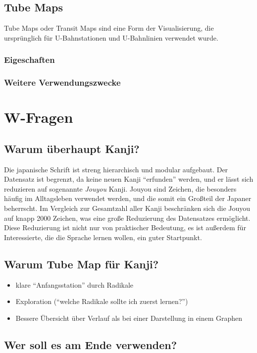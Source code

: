 \documentclass[color,german]{tudbook}
\begin{document}
\section{Tube Maps}
Tube Maps oder Transit Maps sind eine Form der Visualisierung, die ursprünglich für U-Bahnstationen und U-Bahnlinien verwendet wurde. 
\subsection{Eigeschaften}
\subsection{Weitere Verwendungszwecke}

\chapter{W-Fragen}
\section{Warum überhaupt Kanji?}
Die japanische Schrift ist streng hierarchisch und modular aufgebaut. Der Datensatz ist begrenzt, da keine neuen Kanji "`erfunden"' werden, und er lässt sich reduzieren auf sogenannte \emph{Jouyou} Kanji. Jouyou sind Zeichen, die besonders häufig im Alltagsleben verwendet werden, und die somit ein Großteil der Japaner beherrscht. Im Vergleich zur Gesamtzahl aller Kanji beschränken sich die Jouyou auf knapp 2000 Zeichen, was eine große Reduzierung des Datensatzes ermöglicht.
Diese Reduzierung ist nicht nur von praktischer Bedeutung, es ist außerdem für Interessierte, die die Sprache lernen wollen, ein guter Startpunkt. 

\section{Warum Tube Map für Kanji?}
\begin{itemize}
\item klare "`Anfangsstation"' durch Radikale
\item Exploration ("`welche Radikale sollte ich zuerst lernen?"')
\item Bessere Übersicht über Verlauf als bei einer Darstellung in einem Graphen
\end{itemize}

\section{Wer soll es am Ende verwenden?}
\end{document}
